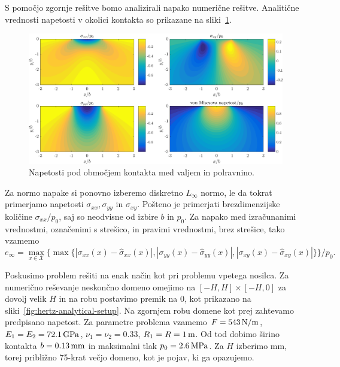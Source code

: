 \documentclass[12pt,a4paper,twoside]{article}
\theoremstyle{definition} %
\theoremstyle{plain} %
\numberwithin{equation}{section}
\newcommand{\X}{\mathcal{X}}
\begin{document}
S pomočjo zgornje rešitve bomo analizirali napako numerične rešitve.
Analitične vrednosti napetosti v okolici kontakta so prikazane na sliki~\ref{fig:hertz-analytical}.

\begin{figure}[!h]
  \centering
  \includegraphics[width=\textwidth]{images/hertzian_analytical.png}
  \caption{Napetosti pod območjem kontakta med valjem in polravnino.}
  \label{fig:hertz-analytical}
\end{figure}

Za normo napake si ponovno izberemo diskretno $L_\infty$ normo, le da tokrat
primerjamo napetosti $\sigma_{xx}, \sigma_{yy}$ in $\sigma_{xy}$. Pošteno je primerjati
brezdimenzijske količine $\sigma_{xx}/p_0$, saj so neodvisne od izbire $b$ in $p_0$.
Za napako med izračunanimi vrednostmi, označenimi s strešico, in pravimi vrednostmi, brez strešice,
tako vzamemo
\begin{equation}
  e_\infty = \max_{x\in \X} \{\max\{|\sigma_{xx}(x)-\hat{\sigma}_{xx}(x)|,
                                   |\sigma_{yy}(x)-\hat{\sigma}_{yy}(x)|,
                                   |\sigma_{xy}(x)-\hat{\sigma}_{xy}(x)| \}\} / p_0.
\end{equation}

Poskusimo problem rešiti na enak način kot pri problemu vpetega nosilca.
Za numerično reševanje neskončno domeno omejimo na $[-H, H] \times [-H, 0]$ za dovolj velik $H$
in na robu postavimo premik na 0, kot prikazano na sliki~\ref{fig:hertz-analytical-setup}. Na
zgornjem robu domene kot prej zahtevamo predpisano napetost. Za parametre problema vzamemo $F =
\unit[543]{N/m}$, $E_1 = E_2 = \unit[72.1]{GPa}$, $\nu_1 = \nu_2 = 0.33$, $R_1 = R = \unit[1]{m}$.
Od tod dobimo širino kontakta $b = \unit[0.13]{mm}$ in maksimalni tlak $p_0 = \unit[2.6]{MPa}$.
Za $H$ izberimo \unit[10]{mm}, torej približno 75-krat večjo domeno, kot je pojav, ki ga opazujemo.
\end{document}
